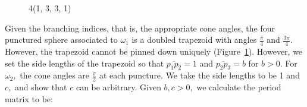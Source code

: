 \documentclass[12pt,reqno]{amsart}
\theoremstyle{definition}
\theoremstyle{remark}
\begin{document}
 
\begin{figure}[htbp]
    \centering
    \qquad
   \qquad
    \caption{4(1, 3, 3, 1)}%
    \label{fig:1331}%
\end{figure}

Given the branching indices, that is, the appropriate cone angles, the four punctured sphere associated to $\omega_1$ is a doubled trapezoid with angles $\frac{\pi}{4}$ and $\frac{3 \pi}{4}.$ However, the trapezoid cannot be pinned down uniquely (Figure~\ref{fig:1331}). However, we set the side lengths of the trapezoid so that $\overline{p_1 p_2} = 1$ and $\overline{p_2 p_3} = b$ for $b > 0.$ For $\omega_2,$ the cone angles are $\frac{\pi}{2}$ at each puncture. We take the side lengths to be 1 and $c,$ and show that $c$ can be arbitrary. Given $b, c >0,$ we calculate the period matrix to be:
\end{document}
